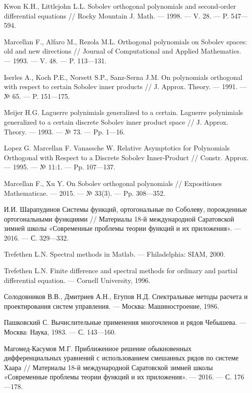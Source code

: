 \begin{thebibliography}{111}
{Kwon K.H., Littlejohn L.L.}
 Sobolev orthogonal polynomials and second-order differential equations
// Rocky Mountain J. Math. --- 1998. --- V. 28. --- P. 547---594.


{Marcellan F., Alfaro M., Rezola M.L.} Orthogonal polynomials on Sobolev spaces: old and new directions
// Journal of Computational and Applied Mathematics. --- 1993. --- V. 48. --- P. 113---131.


{ Iserles A., Koch P.E., Norsett S.P., Sanz-Serna J.M.}
 On polynomials  orthogonal  with respect  to certain Sobolev inner products
// J. Approx. Theory. --- 1991. --- № 65. --- P. 151---175.


{Meijer H.G.} Laguerre polynimials generalized to a certain.
Laguerre polynimials generalized to a certain discrete Sobolev inner product space
// J. Approx. Theory. --- 1993. --- № 73. --- Pp. 1---16.


{Lopez G. Marcellan F. Vanassche W.}
 Relative Asymptotics for Polynomials Orthogonal with Respect to a Discrete Sobolev Inner-Product
// Constr. Approx. --- 1995. --- № 11:1. --- Pp. 107---137.


{Marcellan F., Xu Y.}
 On Sobolev orthogonal polynomials
// Expositiones Mathematicae. --- 2015. --- № 33(3). --- Pp. 308---352.


И.И. Шарапудинов
 Системы функций, ортогональные по Соболеву, порожденные ортогональными функциями
// Материалы 18-й международной Саратовской зимней школы «Современные проблемы теории функций и их приложения». --- 2016. --- С. 329---332.


{Trefethen  L.N.} Spectral methods in Matlab. --- Fhiladelphia: SIAM, 2000.


{Trefethen  L.N.}
Finite difference and spectral methods for ordinary and partial differential equation. --- Cornell University, 1996.


{Солодовников В.В., Дмитриев А.Н., Егупов Н.Д.}
Спектральные методы расчета и проектирования систем управления. --- Москва: Машиностроение, 1986.


{Пашковский С.} Вычислительные применения многочленов и рядов Чебышева. --- Москва: Наука, 1983. --- С. 143---160.


{Магомед-Касумов М.Г.}
 Приближенное решение обыкновенных дифференциальных уравнений с использованием смешанных рядов по системе Хаара
// Материалы 18-й международной Саратовской зимней школы «Современные проблемы теории функций и их приложения». --- 2016. --- С. 176---178.



\end{thebibliography}
